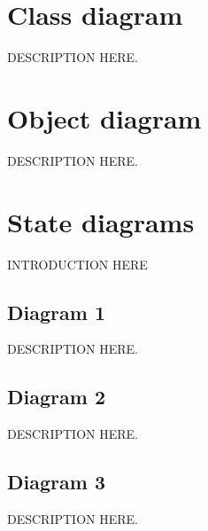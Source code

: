 \documentclass[11pt]{article}
\begin{document}
\pagebreak
\section{Class diagram}
\vspace{10px}
\begin{center}
\end{center}
DESCRIPTION HERE.

\pagebreak
\section{Object diagram}
\vspace{10px}
\begin{center}
\end{center}
DESCRIPTION HERE.

\pagebreak
\section{State diagrams}
INTRODUCTION HERE
\subsection{Diagram 1}
\vspace{10px}
\begin{center}
\end{center}
DESCRIPTION HERE.

\subsection{Diagram 2}
\vspace{10px}
\begin{center}
\end{center}
DESCRIPTION HERE.

\subsection{Diagram 3}
\vspace{10px}
\begin{center}
\end{center}
DESCRIPTION HERE.
\end{document}
